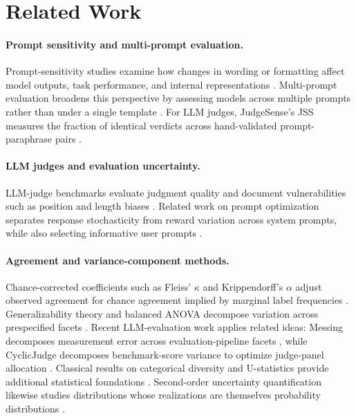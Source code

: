 \documentclass[letterpaper]{article}
\newcommand{\1}{\mathbf 1}
\begin{document}
\section{Related Work}

\paragraph{Prompt sensitivity and multi-prompt evaluation.}
Prompt-sensitivity studies examine how changes in wording or
formatting affect model outputs, task performance, and internal
representations
\citep{sclar2023formatspread,zhu2023promptrobust,chatterjee2024posix,
zhuo2024prosa,romanou2026brittlebench}. Multi-prompt evaluation broadens this perspective by assessing models across multiple prompts rather than under a single template
\citep{mizrahi2024state,polo2024efficient}. For LLM judges,
JudgeSense's JSS measures the fraction of identical verdicts across
hand-validated prompt-paraphrase pairs
\citep{bellibatlu2026judgesense}.

\paragraph{LLM judges and evaluation uncertainty.}
LLM-judge benchmarks evaluate judgment quality and document
vulnerabilities such as position and length biases
\citep{zeng2024llmbar,tan2024judgebench,zheng2023judging,
dubois2024lengthcontrolled,thakur2024judges}. Related work on prompt optimization separates response stochasticity from reward variation across system prompts, while also selecting informative user prompts
\citep{gao2026p1}.

\paragraph{Agreement and variance-component methods.}
Chance-corrected coefficients such as Fleiss' $\kappa$ and
Krippendorff's $\alpha$ adjust observed agreement for chance agreement
implied by marginal label frequencies
\citep{fleiss1971measuring,krippendorff2004content}.
Generalizability theory and balanced ANOVA decompose variation across
prespecified facets
\citep{cronbach1972dependability,brennan2001generalizability,
searle1992variance}. Recent LLM-evaluation work applies related ideas:
Messing decomposes measurement error across evaluation-pipeline facets
\citep{messing2026hidden}, while CyclicJudge decomposes
benchmark-score variance to optimize judge-panel allocation
\citep{zhu2026cyclicjudge}. Classical results on categorical diversity
and U-statistics provide additional statistical foundations
\citep{good1953population,simpson1949measurement,
hoeffding1948class}. Second-order uncertainty quantification likewise
studies distributions whose realizations are themselves probability
distributions \citep{sale2023distance,sale2024variance}.
\end{document}
